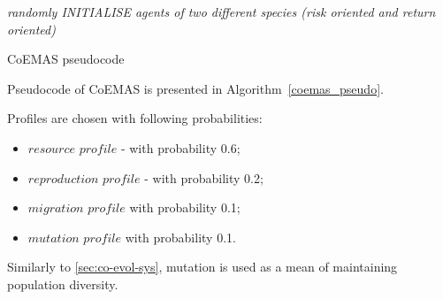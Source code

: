 % 


\begin{algorithm}
 
  \BlankLine
  \emph{randomly INITIALISE agents of two different species (risk oriented and return oriented)}\;
  \caption{CoEMAS pseudocode}\label{coemas_pseudo}
\end{algorithm}

Pseudocode of CoEMAS is presented in Algorithm~\ref{coemas_pseudo}.

Profiles are chosen with following probabilities:
\begin{itemize}
  \item $resource$ $profile$ - with probability 0.6;
  \item $reproduction$ $profile$ - with probability 0.2;
  \item $migration$ $profile$ with probability 0.1;
  \item $mutation$ $profile$ with probability 0.1.
\end{itemize}

Similarly to \ref{sec:co-evol-sys}, mutation is used as a mean of maintaining population diversity.
